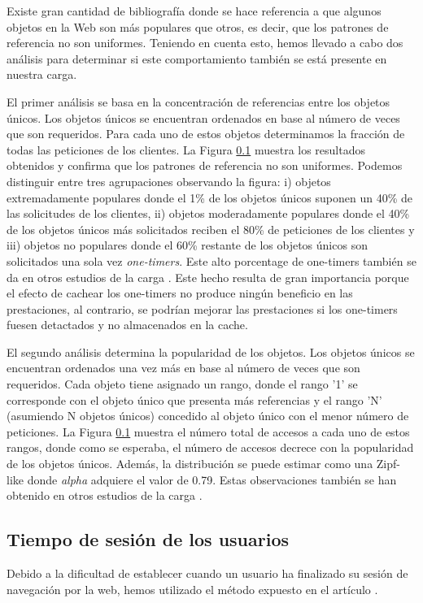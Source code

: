 \documentclass[twocolumn]{Jornadas}
\begin{document}
Existe gran cantidad de bibliografía \cite{} donde se hace referencia a que algunos objetos en la Web son más populares que otros, es decir, que los patrones de referencia no son uniformes. Teniendo en cuenta esto, hemos llevado a cabo dos análisis para determinar si este comportamiento también se está presente en nuestra carga.

El primer análisis se basa en la concentración de referencias entre los objetos únicos. Los objetos únicos se encuentran ordenados en base al número de veces que son requeridos. Para cada uno de estos objetos determinamos la fracción de todas las peticiones de los clientes. La Figura \ref{} muestra los resultados obtenidos y confirma que los patrones de referencia no son uniformes. Podemos distinguir entre tres agrupaciones observando la figura: i) objetos extremadamente populares donde el 1\% de los objetos únicos suponen un 40\% de las solicitudes de los clientes, ii) objetos moderadamente populares donde el 40\% de los objetos únicos más solicitados reciben el 80\% de peticiones de los clientes y iii) objetos no populares donde el 60\% restante de los objetos únicos son solicitados una sola vez \emph{one-timers}. Este alto porcentage de one-timers también se da en otros estudios de la carga \cite{}.
Este hecho resulta de gran importancia porque el efecto de cachear los one-timers no produce ningún beneficio en las prestaciones, al contrario, se podrían mejorar las prestaciones si los one-timers fuesen detactados y no almacenados en la cache.

El segundo análisis determina la popularidad de los objetos. Los objetos únicos se encuentran ordenados una vez más en base al número de veces que son requeridos. Cada objeto tiene asignado un rango, donde el rango '1' se corresponde con el objeto único que presenta más referencias y el rango 'N' (asumiendo N objetos únicos) concedido al objeto único con el menor número de peticiones. La Figura \ref{} muestra el número total de accesos a cada uno de estos rangos, donde como se esperaba, el número de accesos decrece con la popularidad de los objetos únicos. Además, la distribución se puede estimar como una Zipf-like donde \emph{alpha} adquiere el valor de 0.79. Estas observaciones también se han obtenido en otros estudios de la carga \cite{}.

\subsection{Tiempo de sesión de los usuarios}
Debido a la dificultad de establecer cuando un usuario ha finalizado su sesión de navegación por la web, hemos utilizado el método expuesto en el artículo \cite{}.
\end{document}
